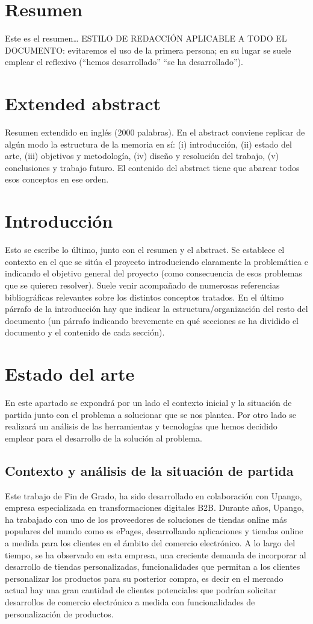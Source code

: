 \documentclass[12pt]{article}
\begin{document}
\section{Resumen}
Este es el resumen…
ESTILO DE REDACCIÓN APLICABLE A TODO EL DOCUMENTO: evitaremos el uso de la primera persona; en su lugar se suele emplear el reflexivo (“hemos desarrollado” “se ha desarrollado”).


\section{Extended abstract}
Resumen extendido en inglés (2000 palabras). En el abstract conviene replicar de algún modo la estructura de la memoria en sí: (i) introducción, (ii) estado del arte, (iii) objetivos y metodología, (iv) diseño y resolución del trabajo, (v) conclusiones y trabajo futuro. El contenido del abstract tiene que abarcar todos esos conceptos en ese orden.

\section{Introducción}
Esto se escribe lo último, junto con el resumen y el abstract. Se establece el contexto en el que se sitúa el proyecto introduciendo claramente la problemática e indicando el objetivo general del proyecto (como consecuencia de esos problemas que se quieren resolver). Suele venir acompañado de numerosas referencias bibliográficas relevantes sobre los distintos conceptos tratados. En el último párrafo de la introducción hay que indicar la estructura/organización del resto del documento (un párrafo indicando brevemente en qué secciones se ha dividido el documento y el contenido de cada sección).

\section{Estado del arte}
En este apartado se expondrá por un lado el contexto inicial y la situación de partida junto con el problema a solucionar que se nos plantea. Por 
otro lado se realizará un análisis de las herramientas y tecnologías que hemos decidido emplear para el desarrollo de la solución al problema.
\subsection{Contexto y análisis de la situación de partida}
Este trabajo de Fin de Grado, ha sido desarrollado en colaboración con Upango, empresa especializada en transformaciones digitales B2B.
Durante años, Upango, ha trabajado con uno de los proveedores de soluciones de tiendas online más populares del mundo como es ePages,
desarrollando aplicaciones y tiendas online a medida para los clientes en el ámbito del comercio electrónico. A lo largo del tiempo,
se ha observado en esta empresa, una creciente demanda de incorporar al desarrollo de tiendas personalizadas, funcionalidades que permitan a los clientes
personalizar los productos para su posterior compra, es decir en el mercado actual hay una gran cantidad de clientes potenciales que podrían solicitar desarrollos de comercio
electrónico a medida con funcionalidades de personalización de productos.
\end{document}
